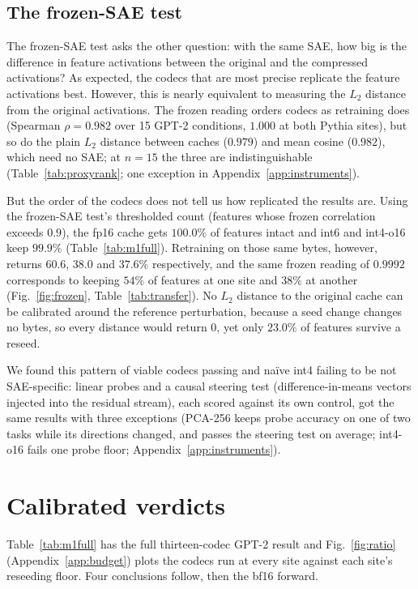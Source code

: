\documentclass{article}
\begin{document}
\subsection{The frozen-SAE test}
\label{sec:frozen}

The frozen-SAE test asks the other question: with the same SAE, how
big is the difference in feature activations between the original and
the compressed activations? As expected, the codecs that are most precise
replicate the feature activations best. However, this is nearly
equivalent to measuring the $L_2$ distance from the original
activations.
The frozen reading orders codecs as retraining does (Spearman
$\rho = 0.982$ over 15 GPT-2 conditions, $1.000$ at both Pythia sites),
but so do the plain $L_2$ distance between caches ($0.979$) and mean
cosine ($0.982$), which need no SAE; at $n = 15$ the three are
indistinguishable (Table~\ref{tab:proxyrank}; one exception in
Appendix~\ref{app:instruments}).

But the order of the codecs does not tell us how replicated the
results are. Using the frozen-SAE test's thresholded count (features
whose frozen correlation exceeds $0.9$), the fp16 cache gets $100.0\%$
of features intact and int6 and int4-o16 keep $99.9\%$
(Table~\ref{tab:m1full}). Retraining on those same bytes, however,
returns $60.6$, $38.0$ and $37.6\%$ respectively, and the same frozen
reading of $0.9992$ corresponds to keeping $54\%$ of features at one
site and $38\%$ at another (Fig.~\ref{fig:frozen},
Table~\ref{tab:transfer}). No $L_2$ distance to the original cache can
be calibrated around the reference perturbation,
because a seed change changes no bytes, so every distance would
return $0$, yet only $23.0\%$ of features survive a reseed.

We found this pattern of viable codecs passing and na\"ive int4
failing to be not SAE-specific: linear probes and a causal steering
test (difference-in-means vectors injected into the residual stream),
each scored against its own control, got the same results with three
exceptions (PCA-256 keeps probe accuracy on one of two tasks while its
directions changed, and passes the steering test on average; int4-o16
fails one probe floor; Appendix~\ref{app:instruments}).

\section{Calibrated verdicts}
\label{sec:results}

Table~\ref{tab:m1full} has the full
thirteen-codec GPT-2 result and Fig.~\ref{fig:ratio}
(Appendix~\ref{app:budget}) plots the codecs run at every site
against each site's reseeding floor. Four conclusions follow, then the
bf16 forward.
\end{document}
